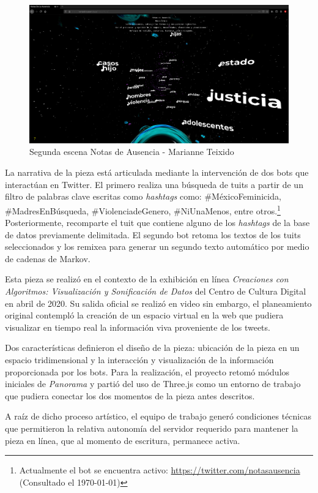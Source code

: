 \begin{figure}
  \includegraphics[width=\textwidth]{img/notas03.png}
  \caption{Segunda escena Notas de Ausencia - Marianne Teixido}
\end{figure}


La narrativa de la pieza está articulada mediante la intervención de dos bots que interactúan en Twitter. El primero realiza una búsqueda de tuits a partir de un filtro de palabras clave escritas como \textit{hashtags} como: \#MéxicoFeminicida, \#MadresEnBúsqueda, \#ViolenciadeGenero, \#NiUnaMenos, entre otros.\footnote{Actualmente el bot se encuentra activo: \url{https://twitter.com/notasausencia} (Consultado el \today)} Posteriormente, recomparte el tuit que contiene alguno de los \textit{hashtags} de la base de datos previamente delimitada. El segundo bot retoma los textos de los tuits seleccionados y los remixea para generar un segundo texto automático por medio de cadenas de Markov. 

Esta pieza se realizó en el contexto de la exhibición en línea \textit{Creaciones con Algoritmos: Visualización y Sonificación de Datos} del Centro de Cultura Digital en abril de 2020. Su salida oficial se realizó en video sin embargo, el planeamiento original contempló la creación de un espacio virtual en la web que pudiera visualizar en tiempo real la información viva proveniente de los tweets.

Dos características definieron el diseño de la pieza: ubicación de la pieza en un espacio tridimensional y la interacción y visualización de la información proporcionada por los bots. Para la realización, el proyecto retomó módulos iniciales de \textit{Panorama} y partió del uso de Three.js como un entorno de trabajo que pudiera conectar los dos momentos de la pieza antes descritos. 

A raíz de dicho proceso artístico, el equipo de trabajo generó condiciones técnicas que permitieron la relativa autonomía del servidor requerido para mantener la pieza en línea, que al momento de escritura, permanece activa.

